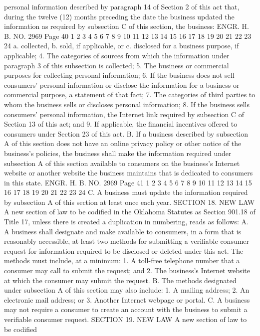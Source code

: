 personal information described by paragraph 14 of Section 2 of this
act that, during the twelve (12) months preceding the date the
business updated the information as required by subsection C of this
section, the business:
ENGR. H. B. NO. 2969 Page 40
1
2
3
4
5
6
7
8
9
10
11
12
13
14
15
16
17
18
19
20
21
22
23
24
a. collected,
b. sold, if applicable, or
c. disclosed for a business purpose, if applicable;
4. The categories of sources from which the information under
paragraph 3 of this subsection is collected;
5. The business or commercial purposes for collecting personal
information;
6. If the business does not sell consumers' personal
information or disclose the information for a business or commercial
purpose, a statement of that fact;
7. The categories of third parties to whom the business sells
or discloses personal information;
8. If the business sells consumers' personal information, the
Internet link required by subsection C of Section 13 of this act;
and
9. If applicable, the financial incentives offered to consumers
under Section 23 of this act.
B. If a business described by subsection A of this section does
not have an online privacy policy or other notice of the business's
policies, the business shall make the information required under
subsection A of this section available to consumers on the
business's Internet website or another website the business
maintains that is dedicated to consumers in this state.
ENGR. H. B. NO. 2969 Page 41
1
2
3
4
5
6
7
8
9
10
11
12
13
14
15
16
17
18
19
20
21
22
23
24
C. A business must update the information required by
subsection A of this section at least once each year.
SECTION 18. NEW LAW A new section of law to be codified
in the Oklahoma Statutes as Section 901.18 of Title 17, unless there
is created a duplication in numbering, reads as follows:
A. A business shall designate and make available to consumers,
in a form that is reasonably accessible, at least two methods for
submitting a verifiable consumer request for information required to
be disclosed or deleted under this act. The methods must include,
at a minimum:
1. A toll-free telephone number that a consumer may call to
submit the request; and
2. The business's Internet website at which the consumer may
submit the request.
B. The methods designated under subsection A of this section
may also include:
1. A mailing address;
2. An electronic mail address; or
3. Another Internet webpage or portal.
C. A business may not require a consumer to create an account
with the business to submit a verifiable consumer request.
SECTION 19. NEW LAW A new section of law to be codified
